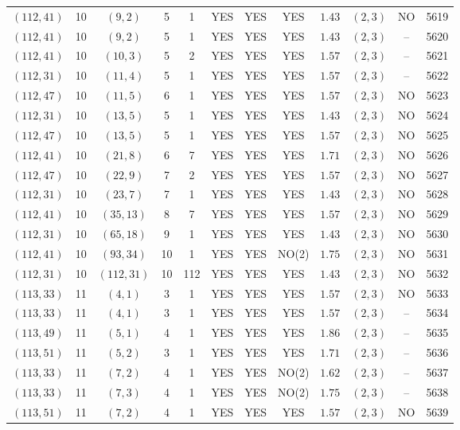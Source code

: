 \begin{longtable}{|c|c|c|c|c|c|c|c|c|c|c|c|}
$(112,41)$ & 10 & $(9,2)$ & 5 & 1 & YES & YES & YES & $1.43$ & $(2,3)$ & NO & 5619\\
$(112,41)$ & 10 & $(9,2)$ & 5 & 1 & YES & YES & YES & $1.43$ & $(2,3)$ & -- & 5620\\
$(112,41)$ & 10 & $(10,3)$ & 5 & 2 & YES & YES & YES & $1.57$ & $(2,3)$ & -- & 5621\\
$(112,31)$ & 10 & $(11,4)$ & 5 & 1 & YES & YES & YES & $1.57$ & $(2,3)$ & -- & 5622\\
$(112,47)$ & 10 & $(11,5)$ & 6 & 1 & YES & YES & YES & $1.57$ & $(2,3)$ & NO & 5623\\
$(112,31)$ & 10 & $(13,5)$ & 5 & 1 & YES & YES & YES & $1.43$ & $(2,3)$ & NO & 5624\\
$(112,47)$ & 10 & $(13,5)$ & 5 & 1 & YES & YES & YES & $1.57$ & $(2,3)$ & NO & 5625\\
$(112,41)$ & 10 & $(21,8)$ & 6 & 7 & YES & YES & YES & $1.71$ & $(2,3)$ & NO & 5626\\
$(112,47)$ & 10 & $(22,9)$ & 7 & 2 & YES & YES & YES & $1.57$ & $(2,3)$ & NO & 5627\\
$(112,31)$ & 10 & $(23,7)$ & 7 & 1 & YES & YES & YES & $1.43$ & $(2,3)$ & NO & 5628\\
$(112,41)$ & 10 & $(35,13)$ & 8 & 7 & YES & YES & YES & $1.57$ & $(2,3)$ & NO & 5629\\
$(112,31)$ & 10 & $(65,18)$ & 9 & 1 & YES & YES & YES & $1.43$ & $(2,3)$ & NO & 5630\\
$(112,41)$ & 10 & $(93,34)$ & 10 & 1 & YES & YES & NO(2) & $1.75$ & $(2,3)$ & NO & 5631\\
$(112,31)$ & 10 & $(112,31)$ & 10 & 112 & YES & YES & YES & $1.43$ & $(2,3)$ & NO & 5632\\
$(113,33)$ & 11 & $(4,1)$ & 3 & 1 & YES & YES & YES & $1.57$ & $(2,3)$ & NO & 5633\\
$(113,33)$ & 11 & $(4,1)$ & 3 & 1 & YES & YES & YES & $1.57$ & $(2,3)$ & -- & 5634\\
$(113,49)$ & 11 & $(5,1)$ & 4 & 1 & YES & YES & YES & $1.86$ & $(2,3)$ & -- & 5635\\
$(113,51)$ & 11 & $(5,2)$ & 3 & 1 & YES & YES & YES & $1.71$ & $(2,3)$ & -- & 5636\\
$(113,33)$ & 11 & $(7,2)$ & 4 & 1 & YES & YES & NO(2) & $1.62$ & $(2,3)$ & -- & 5637\\
$(113,33)$ & 11 & $(7,3)$ & 4 & 1 & YES & YES & NO(2) & $1.75$ & $(2,3)$ & -- & 5638\\
$(113,51)$ & 11 & $(7,2)$ & 4 & 1 & YES & YES & YES & $1.57$ & $(2,3)$ & NO & 5639\\

\end{longtable}
